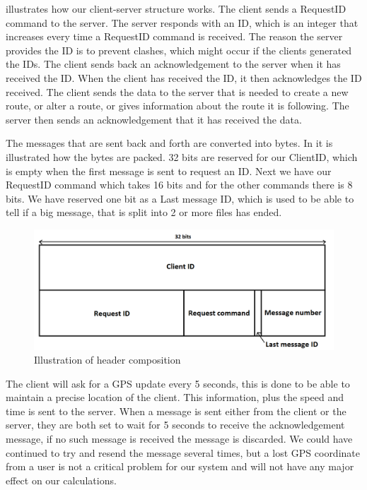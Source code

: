  illustrates how our client-server structure works.
The client sends a RequestID command to the server.
The server responds with an ID, which is an integer that increases every time a RequestID command is received.
The reason the server provides the ID is to prevent clashes, which might occur if the clients generated the IDs.
The client sends back an acknowledgement to the server when it has received the ID.
When the client has received the ID, it then acknowledges the ID received.
The client sends the data to the server that is needed to create a new route,
or alter a route, or gives information about the route it is following.
The server then sends an acknowledgement that it has received the data.


The messages that are sent back and forth are converted into bytes.
In  it is illustrated how the bytes are packed.
32 bits are reserved for our ClientID, which is empty when the first message is sent to request an ID.
Next we have our RequestID command which takes 16 bits and for the other commands there is 8 bits.
We have reserved one bit as a Last message ID, which is used to be able to tell if a big message,
that is split into 2 or more files has ended.

\begin{figure}[h!]
  \centering
    \includegraphics[width=1\textwidth]{figures/bytesclientserver.png}
    \caption{Illustration of header composition}
    \label{fig:bytesclientserver}
\end{figure}

The client will ask for a GPS update every 5 seconds, this is done to be able to maintain a precise location of the client. This information, plus the speed and time is sent to the server.
When a message is sent either from the client or the server,
they are both set to wait for 5 seconds to receive the acknowledgement message, if no such message is received the message is discarded. We could have continued to try and resend the message several times, but a lost GPS coordinate from a user is not a critical problem for our system and will not have any major effect on our calculations.

